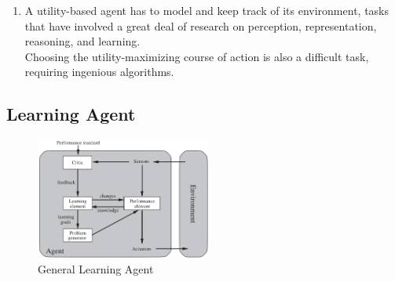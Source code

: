 \begin{enumerate}
    \item A utility-based agent has to model and keep track of its environment, tasks that have involved a great deal of research on perception, representation, reasoning, and learning. \\
    Choosing the utility-maximizing course of action is also a difficult task, requiring ingenious algorithms.
\end{enumerate}


\subsection{Learning Agent \cite{aci-1}}

\begin{figure}[H]
    \centering
    \includegraphics[width=\linewidth, height=4cm, keepaspectratio]{Pictures/ai-ml/agent--learning.png}
    \caption{General Learning Agent \cite{aci-1}}
\end{figure}


